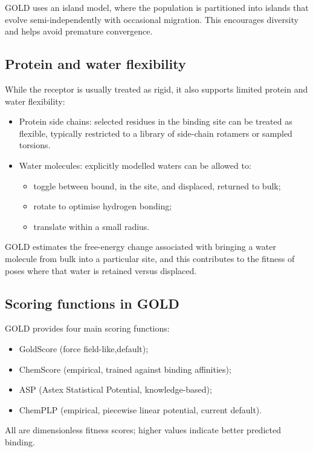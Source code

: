\documentclass[12pt, a4paper]{article}
\begin{document}
GOLD uses an island model, where the population is partitioned into islands that evolve semi-independently with occasional migration. This encourages diversity and helps avoid premature convergence.\cite{CH7_Jones1997}

\subsection{Protein and water flexibility}
While the receptor is usually treated as rigid, it also supports limited protein and water flexibility:
\begin{itemize}
    \item Protein side chains: selected residues in the binding site can be treated as flexible, typically restricted to a library of side-chain rotamers or sampled torsions.
    \item Water molecules: explicitly modelled waters can be allowed to:
    \begin{itemize}
        \item toggle between bound, in the site, and displaced, returned to bulk;
        \item rotate to optimise hydrogen bonding;
        \item translate within a small radius.
    \end{itemize}
\end{itemize}
GOLD estimates the free-energy change associated with bringing a water molecule from bulk into a particular site, and this contributes to the fitness of poses where that water is retained versus displaced.

\subsection{Scoring functions in GOLD}

GOLD provides four main scoring functions:
\begin{itemize}
    \item GoldScore (force field-like,default);
    \item ChemScore (empirical, trained against binding affinities);
    \item ASP (Astex Statistical Potential, knowledge-based);\cite{CH7_Mooij2005}
    \item ChemPLP (empirical, piecewise linear potential, current default).
\end{itemize}
All are dimensionless fitness scores; higher values indicate better predicted binding.
\end{document}
